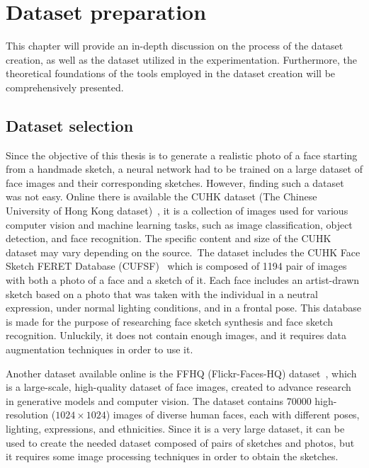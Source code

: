 \newpage
\section{Dataset preparation}
\label{section:datasetChapter}
This chapter will provide an in-depth discussion on the process of the dataset creation, as well as the dataset utilized in the experimentation. Furthermore, the theoretical foundations of the tools employed in the dataset creation will be comprehensively presented.

\subsection{Dataset selection}
Since the objective of this thesis is to generate a realistic photo of a face starting from a handmade sketch, a neural network had to be trained on a large dataset of face images and their corresponding sketches. However, finding such a dataset was not easy. Online there is available the CUHK dataset (The Chinese University of Hong Kong dataset)~\cite{cuhk}, it is a collection of images used for various computer vision and machine learning tasks, such as image classification, object detection, and face recognition. The specific content and size of the CUHK dataset may vary depending on the source. The dataset includes the CUHK Face Sketch FERET Database (CUFSF)~\cite{facePhotoSketch-cuhk, coupledInformationTheoretic-cuhk} which is composed of \num{1194} pair of images with both a photo of a face and a sketch of it. Each face includes an artist-drawn sketch based on a photo that was taken with the individual in a neutral expression, under normal lighting conditions, and in a frontal pose. This database is made for the purpose of researching face sketch synthesis and face sketch recognition. Unluckily, it does not contain enough images, and it requires data augmentation techniques in order to use it.

\noindent Another dataset available online is the FFHQ (Flickr-Faces-HQ) dataset~\cite{ffhq}, which is a large-scale, high-quality dataset of face images, created to advance research in generative models and computer vision. The dataset contains \num{70000} high-resolution ($1024 \times 1024$) images of diverse human faces, each with different poses, lighting, expressions, and ethnicities. Since it is a very large dataset, it can be used to create the needed dataset composed of pairs of sketches and photos, but it requires some image processing techniques in order to obtain the sketches.

